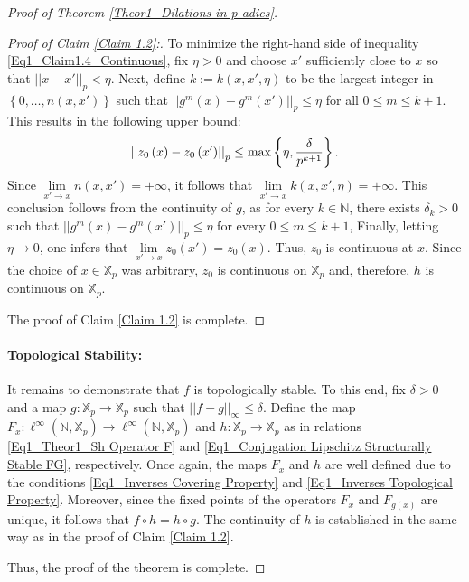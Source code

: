 \documentclass[a4paper, 12pt]{article}
\theoremstyle{definition}
\begin{document}
\begin{proof}[Proof of Theorem \ref{Theor1_Dilations in p-adics}]
\begin{proof}[Proof of Claim \ref{Claim 1.2}:]
			To minimize the right-hand side of inequality \eqref{Eq1_Claim1.4_Continuous}, fix $ \eta  > 0$ and choose $x'$ sufficiently close to $x$ so that $ \left| \left|  x - x'  \right|  \right|_{p}  <  \eta $. 
			Next, define $ k :=  k \left(  x, x',  \eta  \right)  $ to be the largest integer in $ \left\{  0, \dots, n \left(  x, x' \right)   \right\} $ such that $ \left| \left|  g^{m}(x) - g^{m} \left(  x' \right)   \right|  \right|_{p} \le  \eta $ for all $0 \le m \le k +1$. 
			This results in the following upper bound:
			$$  \left| \left|  z_{0} \left(  x  \right)  - z_{0} \left(  x'  \right)   \right|  \right|_{p}   \le    \max \left\{  \eta ,   {\delta  \over p^{k+1} }  \right\}  .$$
			Since $\underset{x' \to x}{\lim} n \left(  x, x'  \right)  = + \infty $, it follows that $\underset{x' \to x}{\lim} k \left(  x, x',  \eta  \right)  = + \infty $. This conclusion follows from the continuity of $g$, as for every $k \in \mathbb{N} $, there exists $\delta_{k}  >0$ such that $ \left| \left|  g^{m} \left(  x  \right)  - g^{m} \left(  x'  \right)   \right|  \right|_{p} \le  \eta $ for every $0 \le m \le k+1$,
			Finally, letting $ \eta \to 0$, one infers that $\underset{x' \to x}{\lim} z_{0} \left(  x'  \right)  = z_{0} \left(  x  \right) $. Thus, $z_{0}$ is continuous at $x$. 
			Since the choice of $x \in \mathbb{X}_{p}$ was arbitrary, $z_{0}$ is continuous on $\mathbb{X}_{p}$ and, therefore, $h$ is continuous on $\mathbb{X}_{p}$. 
			
			The proof of Claim \ref{Claim 1.2} is complete.
			
		\end{proof}
		
		
		
		
		\paragraph{Topological Stability:}
		
		It remains to demonstrate that $f$ is topologically stable. To this end, fix $\delta  > 0$ and a map $g: \mathbb{X}_{p} \to \mathbb{X}_{p}$ such that $ \left| \left|  f - g  \right|  \right|_{ \infty } \le \delta$. Define the map $F_{x}: \ell^{ \infty } \left(   \mathbb{N} ,   \mathbb{X}_{p}  \right)  \to \ell^{ \infty } \left(   \mathbb{N} ,   \mathbb{X}_{p}  \right) $ and $h: \mathbb{X}_{p} \to \mathbb{X}_{p}$ as in relations \eqref{Eq1_Theor1_Sh Operator F} and \eqref{Eq1_Conjugation Lipschitz Structurally Stable FG}, respectively. 
		Once again, the maps $F_{x}$ and $h$ are well defined due to the conditions \eqref{Eq1_Inverses Covering Property} and \eqref{Eq1_Inverses Topological Property}. 
		Moreover, since the fixed points of the operators $F_{x}$ and $F_{g(x)}$ are unique, it follows that $f \circ h = h \circ g$. The continuity of $h$ is established in the same way as in the proof of Claim \ref{Claim 1.2}.
		
		Thus, the proof of the theorem is complete. 
		
	\end{proof}
	
\end{document}
